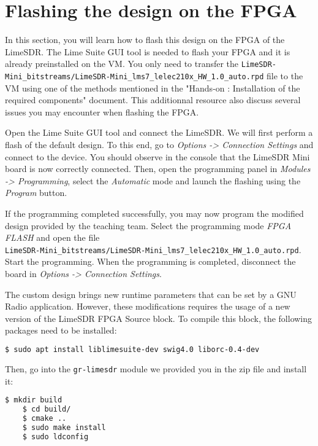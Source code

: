 


\section{Flashing the design on the FPGA}

 In this section, you will learn how to flash this design on the FPGA of the LimeSDR. The Lime Suite GUI tool is needed to flash your FPGA and it is already preinstalled on the VM. You only need to transfer the \texttt{LimeSDR-Mini\_bitstreams/LimeSDR-Mini\_lms7\_lelec210x\_HW\_1.0\_auto.rpd} file to the VM using one of the methods mentioned in the "Hands-on \handsOnN: Installation of the required components" document. This additionnal resource also discuss several issues you may encounter when flashing the FPGA.

Open the Lime Suite GUI tool and connect the LimeSDR. We will first perform a flash of the default design. To this end, go to \textit{Options -> Connection Settings} and connect to the device. You should observe in the console that the LimeSDR Mini board is now correctly connected. Then, open the programming panel in \textit{Modules -> Programming}, select the \textit{Automatic} mode and launch the flashing using the \textit{Program} button.

If the programming completed successfully, you may now program the modified design provided by the teaching team. Select the programming mode \textit{FPGA FLASH} and open the file \\ \texttt{LimeSDR-Mini\_bitstreams/LimeSDR-Mini\_lms7\_lelec210x\_HW\_1.0\_auto.rpd}. Start the programming. When the programming is completed, disconnect the board in \textit{Options -> Connection Settings}.

The custom design brings new runtime parameters that can be set by a GNU Radio application. However, these modifications requires the usage of a new version of the LimeSDR FPGA Source block. To compile this block, the following packages need to be installed:
\begin{lstlisting}[language=bash]
    $ sudo apt install liblimesuite-dev swig4.0 liborc-0.4-dev
\end{lstlisting}
Then, go into the \texttt{gr-limesdr} module we provided you in the zip file and install it:
\begin{lstlisting}[language=bash]
    $ mkdir build
    $ cd build/
    $ cmake ..
    $ sudo make install
    $ sudo ldconfig
\end{lstlisting}

